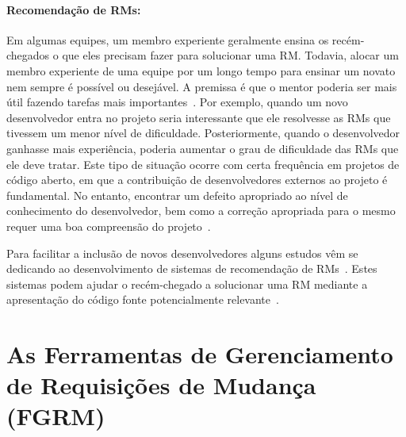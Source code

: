 \paragraph{Recomendação de RMs:}

Em algumas equipes, um membro experiente geralmente ensina os recém-chegados o
que eles precisam fazer para solucionar uma RM\@. Todavia, alocar um membro
experiente de uma equipe por um longo tempo para ensinar um novato nem sempre é
possível ou desejável. A premissa é que o mentor poderia ser mais útil fazendo
tarefas mais importantes~\cite{malheiros2012source}. Por exemplo, quando um novo
desenvolvedor entra no projeto seria interessante que ele resolvesse as RMs que
tivessem um menor nível de dificuldade. Posteriormente, quando o desenvolvedor
ganhasse mais experiência, poderia aumentar o grau de dificuldade das RMs que
ele deve tratar. Este tipo de situação ocorre com certa frequência em projetos
de código aberto, em que a contribuição de desenvolvedores externos ao projeto é
fundamental. No entanto, encontrar um defeito apropriado ao nível de
conhecimento do desenvolvedor, bem como a correção apropriada para o mesmo
requer uma boa compreensão do projeto~\cite{Wang2011bug}.

Para facilitar a inclusão de novos desenvolvedores alguns estudos vêm se
dedicando ao desenvolvimento de sistemas de recomendação de
RMs~\cite{malheiros2012source, Wang2011bug}. Estes sistemas podem ajudar o
recém-chegado a solucionar uma RM mediante a apresentação do código fonte
potencialmente relevante~\cite{malheiros2012source}.


\section{As Ferramentas de Gerenciamento de Requisições de Mudança (FGRM)}\label{sec:ferramentas_de_gerenciamento_requisicoes_de_mudanca}


